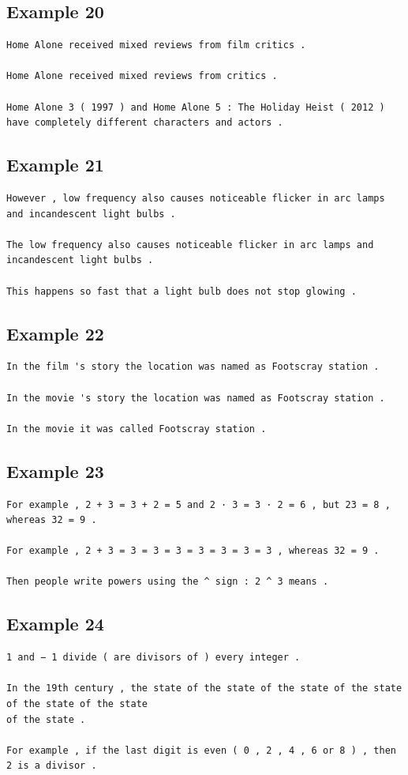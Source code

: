 \documentclass[11pt,twocolumn]{article}
\begin{document}
\subsection*{Example 20}
\label{app:20}
\begin{Verbatim}[fontsize=\scriptsize]
Home Alone received mixed reviews from film critics .

Home Alone received mixed reviews from critics .

Home Alone 3 ( 1997 ) and Home Alone 5 : The Holiday Heist ( 2012 )
have completely different characters and actors .
\end{Verbatim}

\subsection*{Example 21}
\label{app:21}
\begin{Verbatim}[fontsize=\scriptsize]
However , low frequency also causes noticeable flicker in arc lamps and incandescent light bulbs .

The low frequency also causes noticeable flicker in arc lamps and incandescent light bulbs .

This happens so fast that a light bulb does not stop glowing .
\end{Verbatim}

\subsection*{Example 22}
\label{app:22}
\begin{Verbatim}[fontsize=\scriptsize]
In the film 's story the location was named as Footscray station .

In the movie 's story the location was named as Footscray station .

In the movie it was called Footscray station .
\end{Verbatim}

\subsection*{Example 23}
\label{app:23}
\begin{Verbatim}[fontsize=\scriptsize]
For example , 2 + 3 = 3 + 2 = 5 and 2 · 3 = 3 · 2 = 6 , but 23 = 8 , whereas 32 = 9 .

For example , 2 + 3 = 3 = 3 = 3 = 3 = 3 = 3 = 3 , whereas 32 = 9 .

Then people write powers using the ^ sign : 2 ^ 3 means .
\end{Verbatim}

\subsection*{Example 24}
\label{app:24}
\begin{Verbatim}[fontsize=\scriptsize]
1 and − 1 divide ( are divisors of ) every integer .

In the 19th century , the state of the state of the state of the state of the state of the state
of the state .

For example , if the last digit is even ( 0 , 2 , 4 , 6 or 8 ) , then 2 is a divisor .
\end{Verbatim}
\end{document}
